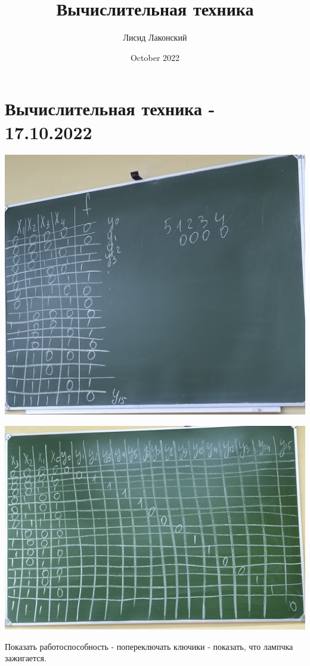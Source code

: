 \documentclass{article}
\title{Вычислительная техника}
\author{Лисид Лаконский}
\date{October 2022}
\begin{document}
\maketitle
\tableofcontents
\pagebreak

\section{Вычислительная техника - 17.10.2022}

\includegraphics[width=\textwidth]{assets/image_1.jpg}

\includegraphics[width=\textwidth]{assets/image_2.jpg}

Показать работоспособность - попереключать ключики - показать, что лампчка зажигается.
\end{document}
